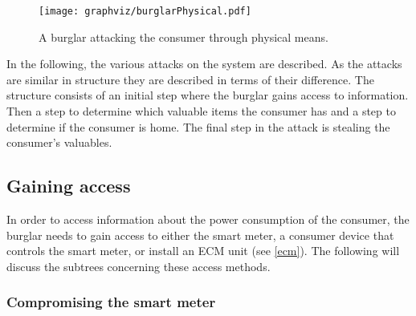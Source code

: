 



\begin{figure}
\center
\texttt{[image: graphviz/burglarPhysical.pdf]}
\caption{A burglar attacking the consumer through physical means.}
\label{attacktree:burglar:physical}
\end{figure}

In the following, the various attacks on the system are described.
As the attacks are similar in structure they are described in terms of their difference.
The structure consists of an initial step where the burglar gains access to information.
Then a step to determine which valuable items the consumer has and a step to determine if the consumer is home.
The final step in the attack is stealing the consumer's valuables.

\subsection{Gaining access}
In order to access information about the power consumption of the consumer, the burglar needs to gain access to either the smart meter, a consumer device that controls the smart meter, or install an ECM unit (see \cref{ecm}).
The following will discuss the subtrees concerning these access methods.

\subsubsection{Compromising the smart meter}\label{compromise:SM}


